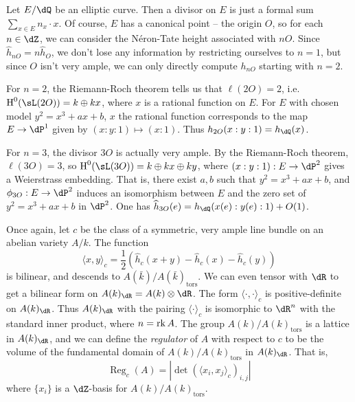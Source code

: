 \begin{example}
Let $E/\dQ$ be an elliptic curve. Then a divisor on $E$ is just a formal sum 
$\sum_{x\in E} n_x\cdot x$. Of course, $E$ has a canonical point -- the origin 
$O$, so for each $n\in \dZ$, we can consider the N\'eron-Tate height associated 
with $n O$. Since $\widehat h_{n O}=n \widehat h_O$, we don't lose any 
information by restricting ourselves to $n=1$, but since $O$ isn't very ample, 
we can only directly compute $h_{n O}$ starting with $n=2$. 

For $n=2$, the Riemann-Roch theorem tells us that $\ell(2 O)=2$, i.e. 
$\h^0(\sL(2 O)) = k\oplus k x$, where $x$ is a rational function on $E$. For 
$E$ with chosen model $y^2=x^3+a x+b$, $x$ the rational function corresponds to 
the map $E\to \dP^1$ given by $(x:y:1)\mapsto (x:1)$. Thus 
$h_{2 O}(x:y:1)=h_\dQ(x)$. 

For $n=3$, the divisor $3 O$ is actually very ample. By the Riemann-Roch 
theorem, $\ell(3 O)=3$, so $\h^0(\sL(3 O))=k\oplus k x\oplus k y$, where 
$(x:y:1):E\to \dP^2$ gives a Weierstrass embedding. That is, there exist 
$a,b$ such that $y^2=x^3+a x+b$, and $\phi_{3 O}:E\to \dP^2$ induces an 
isomorphism between $E$ and the zero set of $y^2=x^3+a x+b$ in $\dP^2$. 
One has $\widehat h_{3 O}(e)=h_\dQ(x(e):y(e):1)+O(1)$. 
\end{example}

Once again, let $c$ be the class of a symmetric, very ample line bundle on an 
abelian variety $A/k$. The function  
\[
  \langle x,y\rangle_c = \frac 1 2 \left(\widehat h_c(x+y) - \widehat h_c(x)-\widehat h_c(y)\right)
\]
is bilinear, and descends to $A(\bar k)/A(\bar k)_\text{tors}$. 
We can even tensor with $\dR$ to get a bilinear form on 
$A(k)_\dR = A(k)\otimes \dR$. The form $\langle \cdot,\cdot\rangle_c$ 
is positive-definite on $A(k)_\dR$. Thus $A(k)_\dR$ with the pairing 
$\langle\cdot\rangle_c$ is isomorphic to $\dR^n$ with the standard inner 
product, where $n=\operatorname{rk} A$. The group $A(k)/A(k)_\text{tors}$ is a 
lattice in $A(k)_\dR$, and we can define the \emph{regulator} of $A$ with 
respect to $c$ to be the volume of the fundamental domain of 
$A(k)/A(k)_\text{tors}$ in $A(k)_\dR$. That is, 
\[
  \operatorname{Reg}_c(A) = \left|\det\left(\langle x_i,x_j\rangle_c\right)_{i,j}\right|
\]
where $\{x_i\}$ is a $\dZ$-basis for $A(k)/A(k)_\text{tors}$. 


